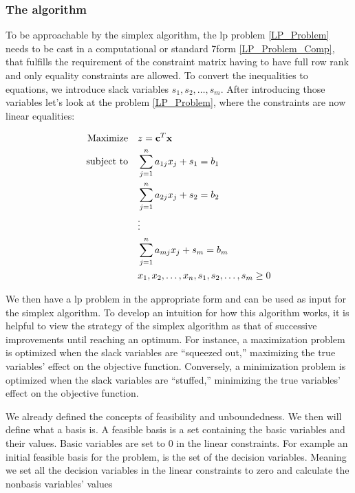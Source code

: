\subsubsection{The algorithm}
To be approachable by the simplex algorithm, the \gls{lp} problem
\ref{LP_Problem} needs to be cast in a
computational or standard 7form \ref{LP_Problem_Comp}, that fulfills the requirement of the constraint matrix having to have
full row rank and only equality  constraints are allowed.
To convert the inequalities to equations, we introduce slack variables
\(s_1, s_2, \dots, s_m\). After introducing those variables
let's look at the problem \ref{LP_Problem}, where the constraints are now linear equalities:

\begin{align}
    \text{Maximize} \quad   & z = \mathbf{c}^T \mathbf{x} \notag                            \\
    \text{subject to} \quad & \sum_{j=1}^{n} a_{1j} x_j + s_1 = b_1 \notag                  \\
                            & \sum_{j=1}^{n} a_{2j} x_j + s_2 = b_2 \notag                  \\
                            & \vdots \notag                                                 \\
                            & \sum_{j=1}^{n} a_{mj} x_j + s_m = b_m \label{LP_Problem_Comp} \\
                            & x_1, x_2, \dots, x_n, s_1, s_2, \dots, s_m \geq 0 \notag
\end{align}

We then have a \gls{lp} problem in the appropriate form and can be used as input for
the simplex algorithm. To develop an intuition for how this algorithm works,
it is helpful to view the strategy of the simplex algorithm as that of
successive improvements until reaching an optimum. For instance, a maximization problem is optimized when the slack
variables are “squeezed out,” maximizing the true variables’ effect on the objective
function. Conversely, a minimization problem is optimized when the slack variables
are “stuffed,” minimizing the true variables’ effect on the objective function.

We already defined the concepts of feasibility and unboundedness.
We then will define what a basis is. A feasible basis is a set containing the basic 
variables and their values. Basic variables are set to 0 in the linear constraints.
For example an initial feasible basis for the problem, is the set of the decision variables.
Meaning we set all the decision variables in the linear constraints to zero and 
calculate the nonbasis variables' values 


